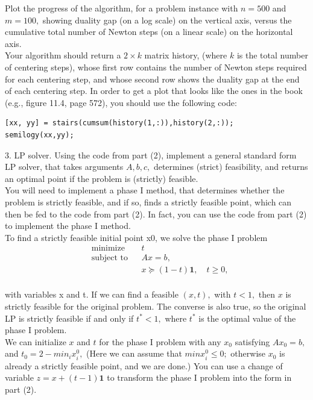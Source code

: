 \documentclass{article}
\begin{document}
Plot the progress of the algorithm, for a problem instance with $n = 500$ and $m = 100,$
showing duality gap (on a log scale) on the vertical axis, versus the cumulative total
number of Newton steps (on a linear scale) on the horizontal axis. \\

Your algorithm should return a $2 \times k$ matrix history, (where $k$ is the total number
of centering steps), whose first row contains the number of Newton steps required
for each centering step, and whose second row shows the duality gap at the end of
each centering step. In order to get a plot that looks like the ones in the book (e.g.,
figure 11.4, page 572), you should use the following code:

\begin{verbatim}
[xx, yy] = stairs(cumsum(history(1,:)),history(2,:));
semilogy(xx,yy);
\end{verbatim}

3. LP solver. Using the code from part (2), implement a general standard form LP
solver, that takes arguments $A, b, c,$ determines (strict) feasibility, and returns an
optimal point if the problem is (strictly) feasible.\\

You will need to implement a phase I method, that determines whether the problem
is strictly feasible, and if so, finds a strictly feasible point, which can then be fed to
the code from part (2). In fact, you can use the code from part (2) to implement the phase I method. \\

To find a strictly feasible initial point x0, we solve the phase I problem
\begin{align*}
	&\text{minimize } && t\\
	&\text{subject to} && Ax = b,\\
	& && x \succeq (1 - t) \mathbf{1}, \quad t \geq 0,\\	
\end{align*}

with variables x and t. If we can find a feasible $(x, t),$ with $t < 1,$ then $x$ is strictly
feasible for the original problem. The converse is also true, so the original LP is strictly
feasible if and only if $t^* < 1,$ where $t^*$ is the optimal value of the phase I problem. \\

We can initialize $x$ and $t$ for the phase I problem with any $x_0$ satisfying $Ax_0 = b,$ and
$t_0 = 2 - min_i x^0_i,$
(Here we can assume that 
$min x^0_i \leq 0;$ otherwise $x_0$ is already a strictly
feasible point, and we are done.) You can use a change of variable $z = x + (t - 1) \mathbf{1}$ to
transform the phase I problem into the form in part (2). \\
\end{document}
